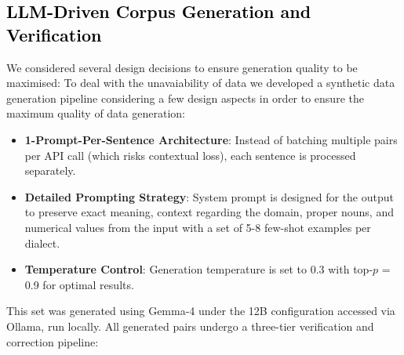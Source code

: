 \subsection{\textcolor{black}{LLM-Driven Corpus Generation and Verification}}

We considered several design decisions to ensure generation quality to be maximised:
To deal with the unavaiability of data we developed a synthetic data generation pipeline considering a few design aspects in order to ensure the maximum quality of data generation:
\begin{itemize}
    \item \textbf{1-Prompt-Per-Sentence Architecture}: Instead of batching multiple pairs per API call (which risks contextual loss), each sentence is processed separately.
    \item \textbf{Detailed Prompting Strategy}: System prompt is designed for the output to preserve exact meaning, context regarding the domain, proper nouns, and numerical values from the input with a set of 5-8 few-shot examples per dialect.
    \item \textbf{Temperature Control}: Generation temperature is set to 0.3 with top-$p$ = 0.9 for optimal results.
\end{itemize}
This set was generated using Gemma-4 \cite{gemma2024} under the 12B configuration accessed via Ollama, run locally.
All generated pairs undergo a three-tier verification and correction pipeline:

